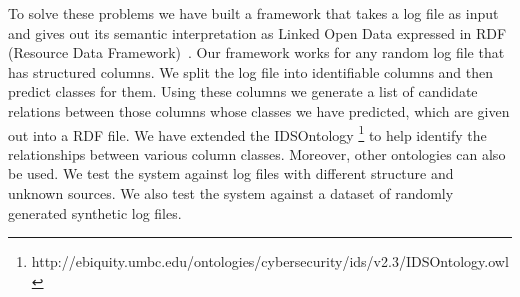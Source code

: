 To solve these problems we have built a framework that takes a log file as input and gives out its semantic interpretation as Linked Open Data expressed in RDF (Resource Data Framework)~\cite{brickley2004rdf}. Our framework works for any random log file that has structured columns. We split the log file into identifiable columns and then predict classes for them. Using these columns we generate a list of candidate relations between those columns whose classes we have predicted, which are given out into a RDF file. We have extended the IDSOntology \footnote{http://ebiquity.umbc.edu/ontologies/cybersecurity/ids/v2.3/IDSOntology.owl} to help identify the relationships between various column classes. Moreover, other ontologies can also be used. We test the system against log files with different structure and unknown sources. We also test the system against a dataset of randomly generated synthetic log files.
